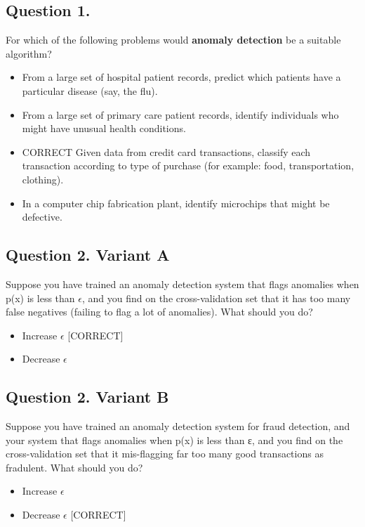 \subsection*{Question 1. }
For which of the following problems would \textbf{anomaly detection} be a suitable algorithm?

\begin{itemize}
\item From a large set of hospital patient records, predict which patients have a particular disease (say, the flu).
\item From a large set of primary care patient records, identify individuals who might have unusual health conditions.
\item CORRECT
Given data from credit card transactions, classify each transaction according to type of purchase (for example: food, transportation, clothing).
\item 
In a computer chip fabrication plant, identify microchips that might be defective.
\end{itemize}

\subsection*{Question 2. Variant A}
Suppose you have trained an anomaly detection system that flags anomalies when p(x) is less than $\epsilon$, and you find on the cross-validation set that it has 
too many false negatives (failing to flag a lot of anomalies). What should you do?


\begin{itemize}
\item Increase $\epsilon$ [CORRECT]
\item Decrease $\epsilon$
\end{itemize}

\subsection*{Question 2. Variant B}
Suppose you have trained an anomaly detection system for fraud detection, and your system that flags anomalies when p(x) is less than ε, and you find on the 
cross-validation set that it mis-flagging far too many good transactions as fradulent. What should you do?

\begin{itemize}
\item Increase $\epsilon$ 
\item Decrease $\epsilon$ [CORRECT]
\end{itemize}

